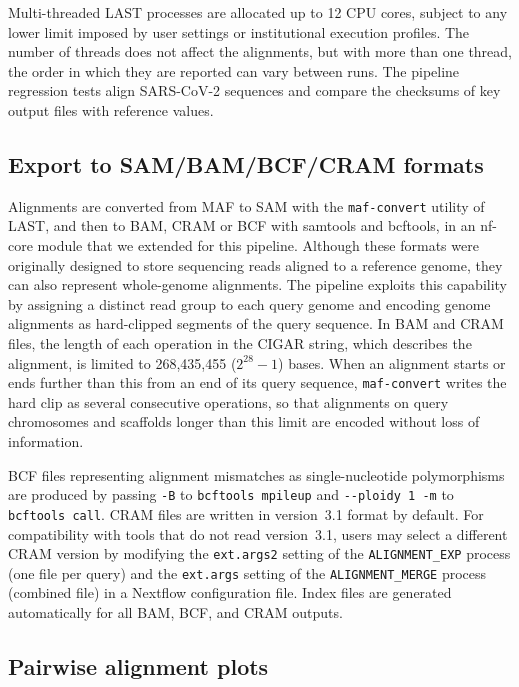 \documentclass[PCJ,Unicode,screen]{cedram}
\begin{document}
Multi-threaded LAST processes are allocated up to 12 CPU cores, subject to any lower limit imposed by user settings or institutional execution profiles. The number of threads does not affect the alignments, but with more than one thread, the order in which they are reported can vary between runs. The pipeline regression tests align SARS-CoV-2 sequences and compare the checksums of key output files with reference values. 

\subsection*{Export to SAM/BAM/BCF/CRAM formats}

Alignments are converted from MAF to SAM with the \texttt{maf-convert} utility of LAST, and then to BAM, CRAM or BCF with samtools and bcftools, in an nf-core module that we extended for this pipeline. Although these formats were originally designed to store sequencing reads aligned to a reference genome, they can also represent whole-genome alignments. The pipeline exploits this capability by assigning a distinct read group to each query genome and encoding genome alignments as hard-clipped segments of the query sequence. In BAM and CRAM files, the length of each operation in the CIGAR string, which describes the alignment, is limited to 268,435,455 ($2^{28}-1$) bases. When an alignment starts or ends further than this from an end of its query sequence, \texttt{maf-convert} writes the hard clip as several consecutive operations, so that alignments on query chromosomes and scaffolds longer than this limit are encoded without loss of information.

BCF files representing alignment mismatches as single-nucleotide polymorphisms are produced by passing \verb|-B| to \texttt{bcftools mpileup} and \verb|--ploidy 1 -m| to \texttt{bcftools call}. CRAM files are written in version~3.1 format by default. For compatibility with tools that do not read version~3.1, users may select a different CRAM version by modifying the \texttt{ext.args2} setting of the \texttt{ALIGNMENT\_EXP} process (one file per query) and the \texttt{ext.args} setting of the \texttt{ALIGNMENT\_MERGE} process (combined file) in a Nextflow configuration file. Index files are generated automatically for all BAM, BCF, and CRAM outputs.

\subsection*{Pairwise alignment plots}
\end{document}
